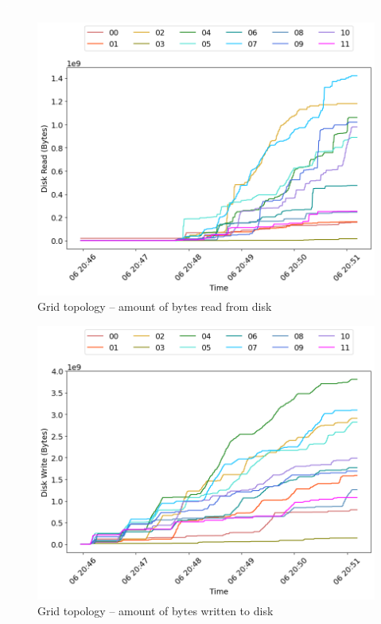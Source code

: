 \textcolor{white}{.}\\

\begin{minipage}{0.5\linewidth}
\begin{figure}[H]
\captionsetup{justification=centering,width=0.8\linewidth}
\includegraphics[width=\linewidth]{figures/grid/blk_read.png}
\caption{Grid topology -- amount of bytes read from disk}
\label{fig:grid-net_read}
\end{figure}
\end{minipage}
\begin{minipage}{0.5\linewidth}
\begin{figure}[H]
\captionsetup{justification=centering,width=0.8\linewidth}
\includegraphics[width=\linewidth]{figures/grid/blk_write.png}
\caption{Grid topology -- amount of bytes written to disk}
\label{fig:grid-net_write}
\end{figure}
\end{minipage}

